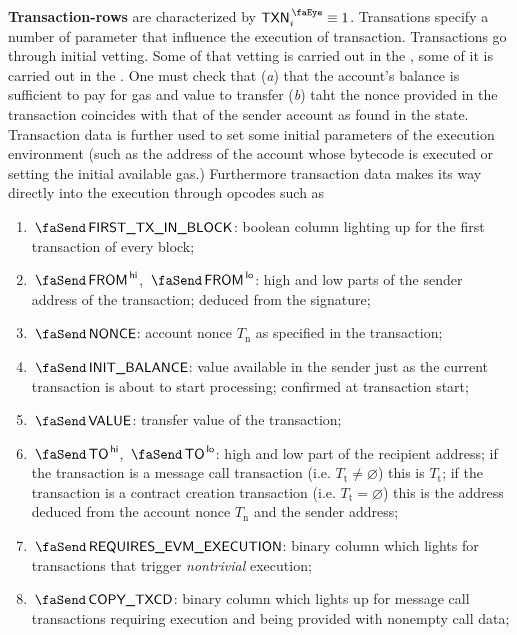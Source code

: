 \textbf{Transaction-rows} are characterized by $\peekTransaction_{i} \equiv 1$.
Transations specify a number of parameter that influence the execution of transaction.
Transactions go through initial vetting.
Some of that vetting is carried out in the \hubMod{}, some of it is carried out in the \txnDataMod{}.
One must check that
(\emph{a}) that the account's balance is sufficient to pay for gas and value to transfer
(\emph{b}) taht the nonce provided in the transaction coincides with that of the sender account as found in the state.
Transaction data is further used to set some initial parameters of the execution environment (such as the address of the account whose bytecode is executed or setting the initial available gas.)
Furthermore transaction data makes its way directly into the execution through opcodes such as \inst{}
\begin{enumerate}
	\item
		\godGiven{}
		$\txFirstTransactionInBlock$:
		boolean column lighting up for the first transaction of every block;
	\item
		\godGiven{}
		$\txFrom\high$, $\txFrom\low$:
		high and low parts of the sender address of the transaction; deduced from the signature;
	\item
		\godGiven{}
		$\txNonce$:
		account nonce $T_\text{n}$ as specified in the transaction;
	\item
		\godGiven{}
		\markAsJustifiedHere{}
		$\txInitialBalance$:
		value available in the sender just as the current transaction is about to start processing; confirmed at transaction start;
	\item
		\godGiven{}
		$\txValue$:
		transfer value of the transaction;
	\item
		\godGiven{}
		$\txTo\high$, $\txTo\low$:
		high and low part of the recipient address;
		if the transaction is a message call transaction (i.e. $T_{\text{t}} \neq \varnothing$) this is $T_{\text{t}}$;
		if the transaction is a contract creation transaction (i.e. $T_{\text{t}} = \varnothing$) this is the address deduced from the account nonce $T_\text{n}$ and the sender address;
	\item
		\godGiven{}
		\markAsPartiallyJustifiedHere{}
		$\txRequiresEvmExecution$:
		binary column which lights for transactions that trigger \emph{nontrivial} \evm{} execution;
	\item
		\godGiven{}
		$\txCopyTxcd$:
		binary column which lights up for message call transactions requiring \evm{} execution and being provided with nonempty call data;

\end{enumerate}
